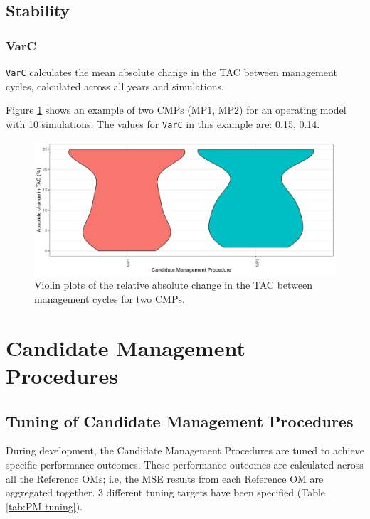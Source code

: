 \documentclass[
]{article}
\begin{document}
\hypertarget{stability}{%
\subsection{Stability}\label{stability}}

\hypertarget{varc}{%
\subsubsection{VarC}\label{varc}}

\texttt{VarC} calculates the mean absolute change in the TAC between management cycles, calculated across all years and simulations.

Figure \ref{fig:VarC} shows an example of two CMPs (MP1, MP2) for an operating model with 10 simulations. The values for \texttt{VarC} in this example are: 0.15, 0.14.

\begin{figure}
\includegraphics[width=37.5in]{../../img/PMs/VarC} \caption{Violin plots of the relative absolute change in the TAC between management cycles for two CMPs.}\label{fig:VarC}
\end{figure}

\hypertarget{CMPs}{%
\section{Candidate Management Procedures}\label{CMPs}}

\hypertarget{tuning}{%
\subsection{Tuning of Candidate Management Procedures}\label{tuning}}

During development, the Candidate Management Procedures are tuned to achieve specific performance outcomes. These performance outcomes are calculated across all the Reference OMs; i.e, the MSE results from each Reference OM are aggregated together. 3 different tuning targets have been specified (Table \ref{tab:PM-tuning}).
\end{document}
